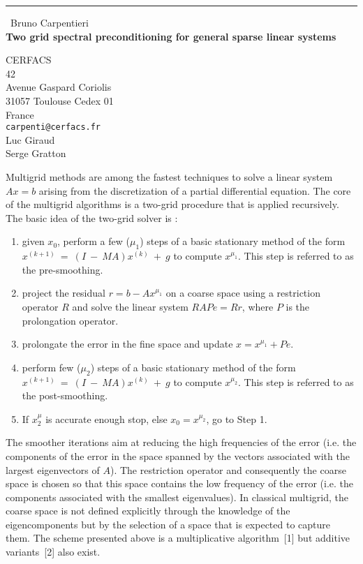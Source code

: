 \documentclass{report}
\begin{document}
\begin{center}
\rule{6in}{1pt} \
{\large Bruno Carpentieri \\
{\bf Two grid spectral preconditioning for general sparse linear systems}}

CERFACS \\ 42 \\ Avenue Gaspard Coriolis \\ 31057 Toulouse Cedex 01 \\ France
\\
{\tt carpenti@cerfacs.fr}\\
Luc Giraud\\
Serge Gratton\end{center}


Multigrid methods are among the fastest techniques to solve a linear
system $Ax = b$ arising from the
discretization of a partial differential equation.
The core of the multigrid algorithms is a two-grid procedure that is applied recursively.
The basic idea of the two-grid solver is :
\begin{enumerate}
\item given $x_0$, perform a few ($\mu_1$) steps of a basic stationary method of
the form $x^{(k+1)}~=~(I~-~MA)x^{(k)}~+~g $ to compute $x^{\mu_1}$.
This step is referred to as the pre-smoothing.
\item project the residual $r = b- Ax^{\mu_1}$ on a coarse space using a
restriction operator $R$ and solve
the linear system $RAP e = R r$, where $P$ is the prolongation operator.
\item prolongate the error in the fine space and update $x = x^{\mu_1} + P e$.
\item perform few ($\mu_2$) steps of a basic stationary method of
the form \\ $x^{(k+1)}~=~(I~-~MA)x^{(k)}~+~g $ to compute $x^{\mu_2}$.
This step is referred to as the post-smoothing.
\item If $x^\mu_2$ is accurate enough stop, else $x_0 = x^{\mu_2}$, go to Step 1.
\end{enumerate}
The smoother iterations aim at reducing the high frequencies of
the error (i.e. the components of the error in the space spanned by the
vectors associated
with the largest eigenvectors of $A$).
The restriction operator and consequently the coarse space is chosen so
that this space contains the
low frequency of the error (i.e. the components associated with the
smallest eigenvalues).
In classical multigrid, the coarse space is not defined explicitly
through the knowledge of the
eigencomponents but by the selection of a space that is expected to capture them.
The scheme presented above is a multiplicative algorithm~[1] but additive
variants~[2] also exist.
\end{document}
